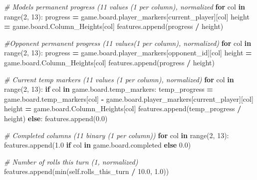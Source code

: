 \documentclass[12pt]{article}
\newenvironment{Shaded}{\begin{snugshade}}{\end{snugshade}}
\newcommand{\BuiltInTok}[1]{#1}
\newcommand{\CommentTok}[1]{\textcolor[rgb]{0.56,0.35,0.01}{\textit{#1}}}
\newcommand{\ControlFlowTok}[1]{\textcolor[rgb]{0.13,0.29,0.53}{\textbf{#1}}}
\newcommand{\DecValTok}[1]{\textcolor[rgb]{0.00,0.00,0.81}{#1}}
\newcommand{\FloatTok}[1]{\textcolor[rgb]{0.00,0.00,0.81}{#1}}
\newcommand{\KeywordTok}[1]{\textcolor[rgb]{0.13,0.29,0.53}{\textbf{#1}}}
\newcommand{\NormalTok}[1]{#1}
\newcommand{\OperatorTok}[1]{\textcolor[rgb]{0.81,0.36,0.00}{\textbf{#1}}}
\newcommand{\VariableTok}[1]{\textcolor[rgb]{0.00,0.00,0.00}{#1}}
\begin{document}
\begin{thesis}
\begin{Shaded}
\begin{Highlighting}[]
        \CommentTok{\# Model\textquotesingle{}s permanent progress (11 values (1 per column), normalized}
        \ControlFlowTok{for}\NormalTok{ col }\KeywordTok{in} \BuiltInTok{range}\NormalTok{(}\DecValTok{2}\NormalTok{, }\DecValTok{13}\NormalTok{):}
\NormalTok{            progress }\OperatorTok{=}\NormalTok{ game.board.player\_markers[current\_player][col]}
\NormalTok{            height }\OperatorTok{=}\NormalTok{ game.board.Column\_Heights[col]}
\NormalTok{            features.append(progress }\OperatorTok{/}\NormalTok{ height)}
        
        \CommentTok{\#Opponent permanent progress (11 values(1 per column), normalized)}
        \ControlFlowTok{for}\NormalTok{ col }\KeywordTok{in} \BuiltInTok{range}\NormalTok{(}\DecValTok{2}\NormalTok{, }\DecValTok{13}\NormalTok{):}
\NormalTok{            progress }\OperatorTok{=}\NormalTok{ game.board.player\_markers[opponent\_id][col]}
\NormalTok{            height }\OperatorTok{=}\NormalTok{ game.board.Column\_Heights[col]}
\NormalTok{            features.append(progress }\OperatorTok{/}\NormalTok{ height)}
        
        \CommentTok{\# Current temp markers (11 values (1 per column), normalized)}
        \ControlFlowTok{for}\NormalTok{ col }\KeywordTok{in} \BuiltInTok{range}\NormalTok{(}\DecValTok{2}\NormalTok{, }\DecValTok{13}\NormalTok{):}
            \ControlFlowTok{if}\NormalTok{ col }\KeywordTok{in}\NormalTok{ game.board.temp\_markers:}
\NormalTok{                temp\_progress }\OperatorTok{=}\NormalTok{ game.board.temp\_markers[col] }\OperatorTok{{-}}
\NormalTok{                          game.board.player\_markers[current\_player][col]}
\NormalTok{                height }\OperatorTok{=}\NormalTok{ game.board.Column\_Heights[col]}
\NormalTok{                features.append(temp\_progress }\OperatorTok{/}\NormalTok{ height)}
            \ControlFlowTok{else}\NormalTok{:}
\NormalTok{                features.append(}\FloatTok{0.0}\NormalTok{)}
        
        \CommentTok{\# Completed columns (11 binary (1 per column))}
        \ControlFlowTok{for}\NormalTok{ col }\KeywordTok{in} \BuiltInTok{range}\NormalTok{(}\DecValTok{2}\NormalTok{, }\DecValTok{13}\NormalTok{):}
\NormalTok{            features.append(}\FloatTok{1.0} \ControlFlowTok{if}\NormalTok{ col }\KeywordTok{in}\NormalTok{ game.board.completed }\ControlFlowTok{else} \FloatTok{0.0}\NormalTok{)}
        
        \CommentTok{\# Number of rolls this turn (1, normalized)}
\NormalTok{        features.append(}\BuiltInTok{min}\NormalTok{(}\VariableTok{self}\NormalTok{.rolls\_this\_turn }\OperatorTok{/} \FloatTok{10.0}\NormalTok{, }\FloatTok{1.0}\NormalTok{))}
        

\end{Highlighting}
\end{Shaded}
\end{thesis}
\end{document}
